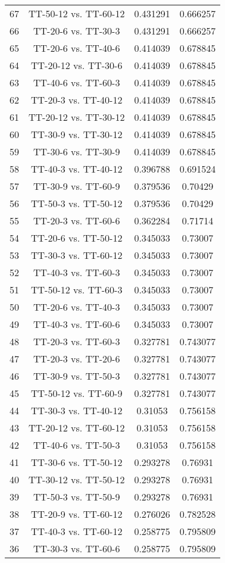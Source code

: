 \documentclass[a4paper,10pt]{article}
\begin{document}
\begin{landscape}
\begin{table}[!htp]
\begin{tabular}{cccc}
67&TT-50-12 vs. TT-60-12&0.431291&0.666257\\
66&TT-20-6 vs. TT-30-3&0.431291&0.666257\\
65&TT-20-6 vs. TT-40-6&0.414039&0.678845\\
64&TT-20-12 vs. TT-30-6&0.414039&0.678845\\
63&TT-40-6 vs. TT-60-3&0.414039&0.678845\\
62&TT-20-3 vs. TT-40-12&0.414039&0.678845\\
61&TT-20-12 vs. TT-30-12&0.414039&0.678845\\
60&TT-30-9 vs. TT-30-12&0.414039&0.678845\\
59&TT-30-6 vs. TT-30-9&0.414039&0.678845\\
58&TT-40-3 vs. TT-40-12&0.396788&0.691524\\
57&TT-30-9 vs. TT-60-9&0.379536&0.70429\\
56&TT-50-3 vs. TT-50-12&0.379536&0.70429\\
55&TT-20-3 vs. TT-60-6&0.362284&0.71714\\
54&TT-20-6 vs. TT-50-12&0.345033&0.73007\\
53&TT-30-3 vs. TT-60-12&0.345033&0.73007\\
52&TT-40-3 vs. TT-60-3&0.345033&0.73007\\
51&TT-50-12 vs. TT-60-3&0.345033&0.73007\\
50&TT-20-6 vs. TT-40-3&0.345033&0.73007\\
49&TT-40-3 vs. TT-60-6&0.345033&0.73007\\
48&TT-20-3 vs. TT-60-3&0.327781&0.743077\\
47&TT-20-3 vs. TT-20-6&0.327781&0.743077\\
46&TT-30-9 vs. TT-50-3&0.327781&0.743077\\
45&TT-50-12 vs. TT-60-9&0.327781&0.743077\\
44&TT-30-3 vs. TT-40-12&0.31053&0.756158\\
43&TT-20-12 vs. TT-60-12&0.31053&0.756158\\
42&TT-40-6 vs. TT-50-3&0.31053&0.756158\\
41&TT-30-6 vs. TT-50-12&0.293278&0.76931\\
40&TT-30-12 vs. TT-50-12&0.293278&0.76931\\
39&TT-50-3 vs. TT-50-9&0.293278&0.76931\\
38&TT-20-9 vs. TT-60-12&0.276026&0.782528\\
37&TT-40-3 vs. TT-60-12&0.258775&0.795809\\
36&TT-30-3 vs. TT-60-6&0.258775&0.795809\\

\end{tabular}
\end{table}
\end{landscape}
\end{document}
